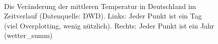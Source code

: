\documentclass[
  letterpaper,
]{scrbook}
\theoremstyle{definition}
\theoremstyle{definition}
\theoremstyle{definition}
\theoremstyle{remark}
\begin{document}
\begin{figure}

\begin{minipage}{0.45\linewidth}



\end{minipage}%
%
\begin{minipage}{0.10\linewidth}
~\end{minipage}%
%
\begin{minipage}{0.45\linewidth}



\end{minipage}%

\caption{\label{fig-wetter1}Die Veränderung der mittleren Temperatur in
Deutschland im Zeitverlauf (Datenquelle: DWD). Links: Jeder Punkt ist
ein Tag (viel Overplotting, wenig nützlich). Rechts: Jeder Punkt ist ein
Jahr (wetter\_summ)}

\end{figure}%
\end{document}
